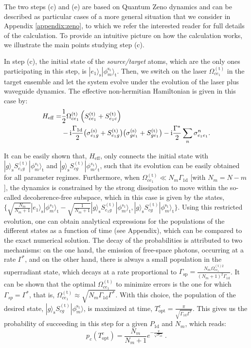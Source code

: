 \documentclass[twocolumn,pra,aps,superscriptaddress,showpacs]{revtex4-1}
\newcommand{\ket}[1]{|#1\rangle}
\def\oned{\mathrm{1d}}
\newcommand{\src}{\mathrm{(s)}}
\newcommand{\trg}{\mathrm{(t)}}
\newcommand{\rs}{\mathrm{s}}
\newcommand{\rt}{\mathrm{t}}
\begin{document}
The two steps (c) and (e) are based on Quantum Zeno dynamics \cite{facchi02a} and can be described as particular cases of a more general situation that we consider in Appendix \ref{appendix:zeno}, to which we refer the interested reader for full details of the calculation. To provide an intuitive picture on how the calculation works, we illustrate the main points studying step (c).

In step (c), the initial state of the \emph{source/target} atoms, which are the only ones participating in this step, is $\ket{e_1}_\rs \ket{\phi_m^{\rs_1}}_\rt$. Then, we switch on the laser $\Omega^\trg_{ce_1}$ in the target ensemble and let the system evolve under the evolution of the laser plus waveguide dynamics. The effective non-hermitian Hamiltonian is given in this case by:
\begin{align}\label{eq:effH}
H_\mathrm{eff} 
	=& \frac{1}{2} \Omega_{ce_1}^\trg  \left( S^\trg_{ce_1}+S^\trg_{e_1c} \right)  \\
	 & -\mathrm{i} \frac{\Gamma_\oned}{2}
	\big(\sigma_{e_1g}^\src + S_{e_1g}^\trg \big) \big(\sigma_{ge_1}^\src + S_{ge_1}^\trg  \big)
	-\mathrm{i} \frac{\Gamma^*}{2}\sum_{n}\sigma^{n}_{e_1e_1}. \notag
\end{align}

It can be easily shown that, $H_\mathrm{eff}$, only connects the initial state with $\ket{g}_\rs S_{e_1 g}^\trg \ket{\phi_m^{s_1}}_\rt$ and $\ket{g}_\rs S_{c g}^\trg \ket{\phi_m^{s_1}}_\rt$, such that its evolution can be easily obtained for all parameter regimes. Furthermore, when $\Omega_{ce_1}^\trg \ll N_m\Gamma_\oned$ [with $N_m=N-m$], the dynamics is constrained by the strong dissipation to move within the so-called decoherence-free subspace, which in this case is given by the states, 
$\{
\sqrt{\frac{N_m}{N_m+1}}\ket{e_1}_\rs \ket{\phi_m^{s_1}}_\rt 
	-\sqrt{\frac{1}{N_m+1}}\ket{g}_\rs S_{e_1 g}^\trg \ket{\phi_m^{s_1}}_\rt,
\ket{g}_\rs S_{c g}^\trg \ket{\phi_m^{\rs_1}}_\rt 
\}$.
Using this restricted evolution, one can obtain analytical expressions for the populations of the different states as a function of time (see Appendix), which can be compared to the exact numerical solution. The decay of the probabilities is attributed to two mechanisms: on the one hand, the emission of free-space photons, occurring at a rate $\Gamma^*$, and on the other hand, 
there is always a small population in the superradiant state, which decays at a rate proportional to $\Gamma_{\mathrm{sp}} = \frac{N_m \Omega_{ce_1}^{\trg 2}}{(N_m+1)^2 \Gamma_{\oned}}$. It can be shown that the optimal $\Omega^\trg_{c e_1}$ to minimize errors is the one for which $\Gamma_{sp} =  \Gamma^*$, that is, $\Omega_{ce_1}^\trg \approx \sqrt{N_m\Gamma_\oned \Gamma^*}$. With this choice, the population of the desired state, $\ket{g}_\rs S_{c g}^\trg \ket{\phi_m^{\rs_1}}$, is maximized at time, $T^c_\mathrm{opt}=\frac{\pi}{\sqrt{\Gamma_\oned\Gamma^*}}$. This gives us the probability of succeeding in this step for a given $P_\oned$ and $N_m$, which reads:
%
\begin{equation} \label{eq:pc}
p_c(T^c_\mathrm{opt})
	=\frac{N_m}{N_m+1}e^{-\frac{\pi}{\sqrt{P_\oned}}}\,.
\end{equation}
\end{document}
